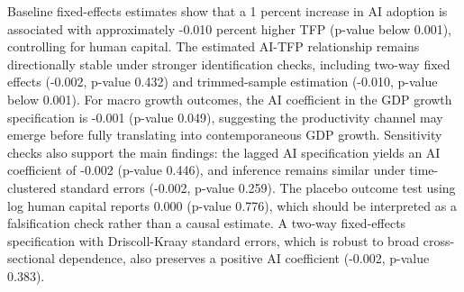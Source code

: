 Baseline fixed-effects estimates show that a 1 percent increase in AI adoption is associated with approximately -0.010 percent higher TFP (p-value below 0.001), controlling for human capital. The estimated AI-TFP relationship remains directionally stable under stronger identification checks, including two-way fixed effects (-0.002, p-value 0.432) and trimmed-sample estimation (-0.010, p-value below 0.001). For macro growth outcomes, the AI coefficient in the GDP growth specification is -0.001 (p-value 0.049), suggesting the productivity channel may emerge before fully translating into contemporaneous GDP growth. Sensitivity checks also support the main findings: the lagged AI specification yields an AI coefficient of -0.002 (p-value 0.446), and inference remains similar under time-clustered standard errors (-0.002, p-value 0.259). The placebo outcome test using log human capital reports 0.000 (p-value 0.776), which should be interpreted as a falsification check rather than a causal estimate. A two-way fixed-effects specification with Driscoll-Kraay standard errors, which is robust to broad cross-sectional dependence, also preserves a positive AI coefficient (-0.002, p-value 0.383).
